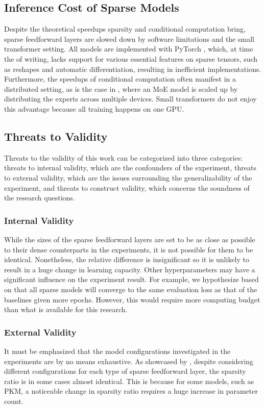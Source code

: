 \subsection{Inference Cost of Sparse Models}
Despite the theoretical speedups sparsity and conditional computation bring, sparse feedforward layers are slowed down by software limitations and the small transformer setting. All models are implemented with PyTorch \cite{paszke_pytorch_2019}, which, at time the of writing, lacks support for various essential features on sparse tensors, such as reshapes and automatic differentiation, resulting in inefficient implementations. Furthermore, the speedups of conditional computation often manifest in a distributed setting, as is the case in \cite{fedus_switch_2022}, where an MoE model is scaled up by distributing the experts across multiple devices. Small transformers do not enjoy this advantage because all training happens on one GPU.

\subsection{Threats to Validity}
Threats to the validity of this work can be categorized into three categories: threats to internal validity, which are the confounders of the experiment, threats to external validity, which are the issues surrounding the generalizability of the experiment, and threats to construct validity, which concerns the soundness of the research questions.
\subsubsection{Internal Validity}
While the sizes of the sparse feedforward layers are set to be as close as possible to their dense counterparts in the experiments, it is not possible for them to be identical. Nonetheless, the relative difference is insignificant so it is unlikely to result in a huge change in learning capacity. Other hyperparameters may have a significant influence on the experiment result. For example, we hypothesize based on  that all sparse models will converge to the same evaluation loss as that of the baselines given more epochs. However, this would require more computing budget than what is available for this research.
\subsubsection{External Validity}
It must be emphasized that the model configurations investigated in the experiments are by no means exhaustive. As showcased by , despite considering different configurations for each type of sparse feedforward layer, the sparsity ratio is in some cases almost identical. This is because for some models, such as PKM, a noticeable change in sparsity ratio requires a huge increase in parameter count. 


